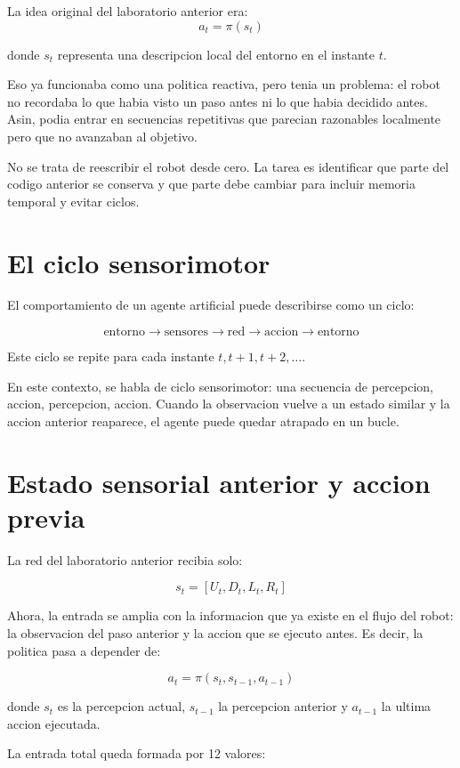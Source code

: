 \documentclass[11pt,a4paper]{article}
\begin{document}
La idea original del laboratorio anterior era:
\[
 a_t = \pi(s_t)
\]

donde $s_t$ representa una descripcion local del entorno en el instante $t$.

Eso ya funcionaba como una politica reactiva, pero tenia un problema: el robot no recordaba lo que habia visto un paso antes ni lo que habia decidido antes. Asin, podia entrar en secuencias repetitivas que parecian razonables localmente pero que no avanzaban al objetivo.

\begin{idea}
No se trata de reescribir el robot desde cero. La tarea es identificar que parte del codigo anterior se conserva y que parte debe cambiar para incluir memoria temporal y evitar ciclos.
\end{idea}

\section{El ciclo sensorimotor}
El comportamiento de un agente artificial puede describirse como un ciclo:

\[
\text{entorno} \rightarrow \text{sensores} \rightarrow \text{red} \rightarrow \text{accion} \rightarrow \text{entorno}
\]

Este ciclo se repite para cada instante $t, t+1, t+2, \dots$.

En este contexto, se habla de ciclo sensorimotor: una secuencia de percepcion, accion, percepcion, accion. Cuando la observacion vuelve a un estado similar y la accion anterior reaparece, el agente puede quedar atrapado en un bucle.

\section{Estado sensorial anterior y accion previa}
La red del laboratorio anterior recibia solo:

\[
 s_t = [U_t, D_t, L_t, R_t]
\]

Ahora, la entrada se amplia con la informacion que ya existe en el flujo del robot: la observacion del paso anterior y la accion que se ejecuto antes. Es decir, la politica pasa a depender de:

\[
 a_t = \pi(s_t, s_{t-1}, a_{t-1})
\]

donde $s_t$ es la percepcion actual, $s_{t-1}$ la percepcion anterior y $a_{t-1}$ la ultima accion ejecutada.

La entrada total queda formada por 12 valores:
\end{document}
